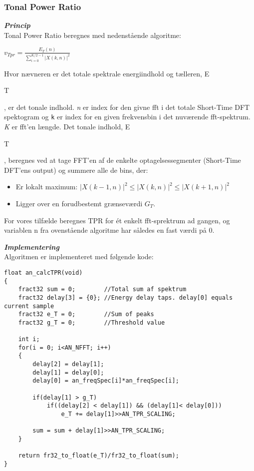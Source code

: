 \subsubsection{Tonal Power Ratio}
\textit{\textbf{Princip}} \\
Tonal Power Ratio beregnes med nedenstående algoritme: 
\begin{center}
${ v }_{ Tpr }=\frac { { E }_{ T }(n) }{ \sum _{ i=0 }^{ K/2-1 }{ { \left| X(k,n) \right|  }^{ 2 } }  } $
\end{center}
Hvor nævneren er det totale spektrale energiindhold og tælleren, E\begin{tiny}T\end{tiny}, er det tonale indhold. 
\textit{n} er index for den givne fft i det totale Short-Time DFT spektogram og \verb+k+ er index for en given frekvensbin i det nuværende fft-spektrum. \textit{K} er fft'en længde.
Det tonale indhold, E\begin{tiny}T\end{tiny}, beregnes ved at tage FFT'en af de enkelte optagelsessegmenter (Short-Time DFT'ens output) og summere alle de bins, der:
\begin{itemize}
	\item Er lokalt maximum: ${ \left| X(k-1,n) \right|  }^{ 2 }\le { \left| X(k,n) \right|  }^{ 2 }\le { \left| X(k+1,n) \right|  }^{ 2 }$
	\item Ligger over en forudbestemt grænseværdi ${ G }_{ T }$.
\end{itemize} 

For vores tilfælde beregnes TPR for ét enkelt fft-sprektrum ad gangen, og variablen n fra ovenstående algoritme har således en fast værdi på 0.

\textit{\textbf{Implementering}} \\
Algoritmen er implementeret med følgende kode:
\begin{verbatim}float an_calcTPR(void)
{
    fract32 sum = 0;		//Total sum af spektrum
    fract32 delay[3] = {0};	//Energy delay taps. delay[0] equals current sample
    fract32 e_T = 0;		//Sum of peaks
    fract32 g_T = 0;		//Threshold value

    int i;
    for(i = 0; i<AN_NFFT; i++)
    {
        delay[2] = delay[1];
        delay[1] = delay[0];
        delay[0] = an_freqSpec[i]*an_freqSpec[i];

        if(delay[1] > g_T)
            if((delay[2] < delay[1]) && (delay[1]< delay[0]))
                e_T += delay[1]>>AN_TPR_SCALING;

        sum = sum + delay[1]>>AN_TPR_SCALING;
    }

    return fr32_to_float(e_T)/fr32_to_float(sum);
}\end{verbatim}

